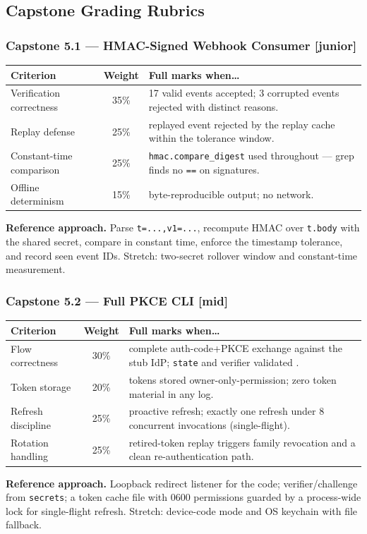 \subsection{Capstone Grading Rubrics}

\subsubsection*{Capstone 5.1 --- HMAC-Signed Webhook Consumer [junior]}
\begin{center}\small
\begin{tabularx}{\textwidth}{l c X}
\toprule
\textbf{Criterion} & \textbf{Weight} & \textbf{Full marks when\ldots} \\
\midrule
Verification correctness & 35\% & 17 valid events accepted; 3 corrupted events rejected with distinct reasons. \\
Replay defense & 25\% & replayed event rejected by the replay cache within the tolerance window. \\
Constant-time comparison & 25\% & \texttt{hmac.compare\_digest} used throughout --- grep finds no \texttt{==} on signatures. \\
Offline determinism & 15\% & byte-reproducible output; no network. \\
\bottomrule
\end{tabularx}
\end{center}
\textbf{Reference approach.} Parse \texttt{t=...,v1=...}, recompute HMAC
over \texttt{t.body} with the shared secret, compare in constant time,
enforce the timestamp tolerance, and record seen event IDs. Stretch:
two-secret rollover window and constant-time measurement.

\subsubsection*{Capstone 5.2 --- Full PKCE CLI [mid]}
\begin{center}\small
\begin{tabularx}{\textwidth}{l c X}
\toprule
\textbf{Criterion} & \textbf{Weight} & \textbf{Full marks when\ldots} \\
\midrule
Flow correctness & 30\% & complete auth-code+PKCE exchange against the stub IdP; \texttt{state} and verifier validated \cite{rfc7636}. \\
Token storage & 20\% & tokens stored owner-only-permission; zero token material in any log. \\
Refresh discipline & 25\% & proactive refresh; exactly one refresh under 8 concurrent invocations (single-flight). \\
Rotation handling & 25\% & retired-token replay triggers family revocation and a clean re-authentication path. \\
\bottomrule
\end{tabularx}
\end{center}
\textbf{Reference approach.} Loopback redirect listener for the code;
verifier/challenge from \texttt{secrets}; a token cache file with 0600
permissions guarded by a process-wide lock for single-flight refresh.
Stretch: device-code mode and OS keychain with file fallback.

